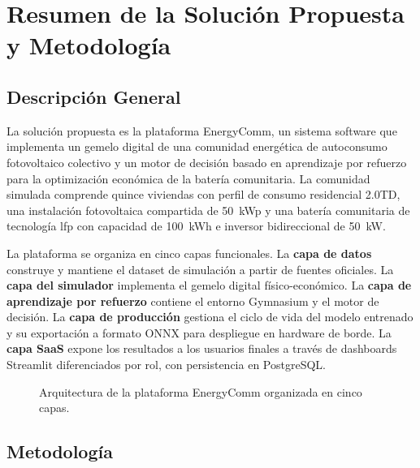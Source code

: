 \documentclass[12pt, a4paper, twoside]{report}
\begin{document}
\chapter{Resumen de la Solución Propuesta y Metodología}
\label{chap:solucion}

\section{Descripción General}

La solución propuesta es la plataforma EnergyComm, un sistema software que
implementa un gemelo digital de una comunidad energética de autoconsumo
fotovoltaico colectivo y un motor de decisión basado en aprendizaje por
refuerzo para la optimización económica de la batería comunitaria. La comunidad
simulada comprende quince viviendas con perfil de consumo residencial 2.0TD,
una instalación fotovoltaica compartida de \SI{50}{kWp} y una batería
comunitaria de tecnología \acrshort{lfp} con capacidad de \SI{100}{kWh} e
inversor bidireccional de \SI{50}{kW}.

La plataforma se organiza en cinco capas funcionales. La \textbf{capa de datos}
construye y mantiene el dataset de simulación a partir de fuentes oficiales. La
\textbf{capa del simulador} implementa el gemelo digital físico-económico. La
\textbf{capa de aprendizaje por refuerzo} contiene el entorno Gymnasium y el
motor de decisión. La \textbf{capa de producción} gestiona el ciclo de vida del
modelo entrenado y su exportación a formato ONNX para despliegue en hardware de
borde. La \textbf{capa SaaS} expone los resultados a los usuarios finales a
través de dashboards Streamlit diferenciados por rol, con persistencia en
PostgreSQL.

\begin{figure}[H]
  \centering
  \caption{Arquitectura de la plataforma EnergyComm organizada en cinco capas.}
  \label{fig:arquitectura}
\end{figure}

\section{Metodología}
\end{document}
